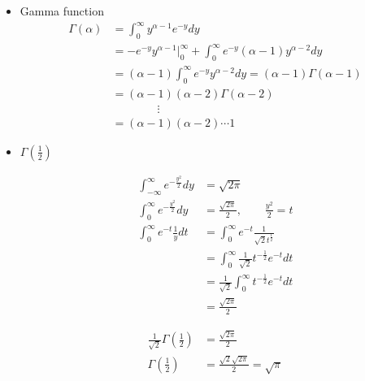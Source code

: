 \documentclass{oblivoir}
\begin{document}
\begin{itemize}
\item Gamma function
\begin{align*}
\Gamma(\alpha) &= \int_0^{\infty} y^{\alpha -1} e^{-y} dy \\
&= - e^{-y} y^{\alpha-1} |_0^{\infty} + \int_0^{\infty} e^{-y} (\alpha - 1) y^{\alpha - 2} dy \\
&= (\alpha - 1) \int_0^{\infty} e^{-y} y^{\alpha -2} dy = (\alpha - 1) \Gamma(\alpha-1) \\
&= (\alpha - 1)(\alpha - 2) \Gamma(\alpha-2)\\
&\quad \quad \quad \quad \vdots \\
&= (\alpha - 1)(\alpha - 2) \cdots 1
\end{align*}
\item $\Gamma(\frac{1}{2})$
\begin{myframe}{}
\begin{align*}
\int_{-\infty}^{\infty} e^{-\frac{y^2}{2}} dy &= \sqrt{2\pi}\\
\int_{0}^{\infty} e^{-\frac{y^2}{2}} dy &= \frac{\sqrt{2\pi}}{2}, \qquad \frac{y^2}{2} = t\\
\int_{0}^{\infty} e^{-t} \frac{1}{y} dt &= \int_{0}^{\infty} e^{-t} \frac{1}{\sqrt{2} t^{\frac{1}{2}}}\\
&= \int_{0}^{\infty} \frac{1}{\sqrt{2}} t^{-\frac{1}{2}}  e^{-t} dt \\
&= \frac{1}{\sqrt{2}} \int_{0}^{\infty} t^{-\frac{1}{2}}  e^{-t} dt \\
&=  \frac{\sqrt{2\pi}}{2}
\end{align*}
\end{myframe}
\begin{align*}
\frac{1}{\sqrt{2}} \Gamma(\frac{1}{2}) &= \frac{\sqrt{2\pi}}{2} \\
\Gamma(\frac{1}{2}) &= \frac{\sqrt{2}\sqrt{2\pi}}{2} = \sqrt{\pi}
\end{align*}


\end{itemize}
\end{document}
